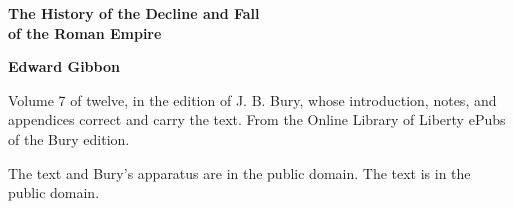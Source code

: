 \documentclass[11pt,letterpaper]{article}
\begin{document}
\color{ink}

\begin{titlepage}
\centering
\vspace*{4em}
{\LARGE\bfseries\color{heading} The History of the Decline and Fall\\[0.3em]of the Roman Empire\par}
\vspace{2em}
{\Large\bfseries\color{heading} Edward Gibbon\par}
\vspace{2.5em}
{\itshape\color{subhead}\parbox{0.8\linewidth}{\centering Volume 7 of twelve, in the edition of J. B. Bury, whose introduction, notes, and appendices correct and carry the text. From the Online Library of Liberty ePubs of the Bury edition.\par}}
\vfill
{\small The text and Bury's apparatus are in the public domain. The text is in the public domain.\par}
\vspace{2em}
\end{titlepage}

\tableofcontents


\end{document}
